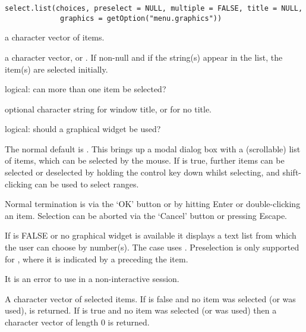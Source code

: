 %
\begin{Usage}
\begin{verbatim}
select.list(choices, preselect = NULL, multiple = FALSE, title = NULL,
             graphics = getOption("menu.graphics"))
\end{verbatim}
\end{Usage}
%
\begin{Arguments}
\begin{ldescription}
\item[\code{choices}] a character vector of items.
\item[\code{preselect}] a character vector, or .  If non-null and
if the string(s) appear in the list, the item(s) are selected
initially.
\item[\code{multiple}] logical: can more than one item be selected?
\item[\code{title}] optional character string for window title, or
 for no title.
\item[\code{graphics}] logical: should a graphical widget be used?
\end{ldescription}
\end{Arguments}
%
\begin{Details}\relax
The normal default is .
This  brings up a modal dialog box with a (scrollable) list
of items, which can be selected by the mouse.  If  is
true, further items can be selected or deselected by holding the
control key down whilst selecting, and shift-clicking can be used to
select ranges.

Normal termination is via the `OK' button or by hitting Enter or
double-clicking an item.  Selection can be aborted via the
`Cancel' button or pressing Escape.

If  is FALSE or no graphical widget is available it
displays a text list from which the user can choose by number(s). The
 case uses .  Preselection is
only supported for , where it is indicated by a
 preceding the item.

It is an error to use  in a non-interactive session. 
\end{Details}
%
\begin{Value}
A character vector of selected items.  If  is false and
no item was selected (or  was used),  is
returned.   If  is true and no item was selected (or
 was used) then a character vector of length 0 is returned.
\end{Value}
